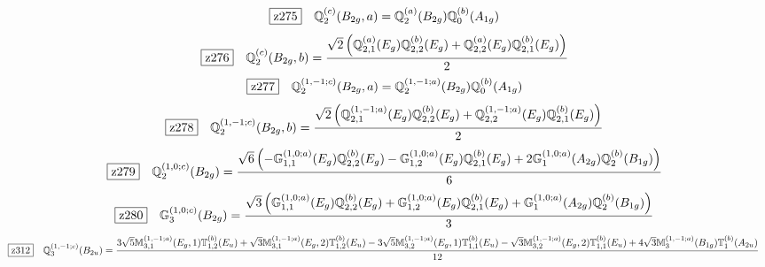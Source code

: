 \documentclass[fleqn,10pt,landscape]{jsarticle}
\begin{document}
\begin{dmath*}
\hspace*{3mm}\fbox{z275}\quad \mathbb{Q}_{2}^{(c)}(B_{2g},a)=\mathbb{Q}_{2}^{(a)}(B_{2g}) \mathbb{Q}_{0}^{(b)}(A_{1g})
\end{dmath*}
\begin{dmath*}
\hspace*{3mm}\fbox{z276}\quad \mathbb{Q}_{2}^{(c)}(B_{2g},b)=\frac{\sqrt{2} \left(\mathbb{Q}_{2,1}^{(a)}(E_{g}) \mathbb{Q}_{2,2}^{(b)}(E_{g}) + \mathbb{Q}_{2,2}^{(a)}(E_{g}) \mathbb{Q}_{2,1}^{(b)}(E_{g})\right)}{2}
\end{dmath*}
\begin{dmath*}
\hspace*{3mm}\fbox{z277}\quad \mathbb{Q}_{2}^{(1,-1;c)}(B_{2g},a)=\mathbb{Q}_{2}^{(1,-1;a)}(B_{2g}) \mathbb{Q}_{0}^{(b)}(A_{1g})
\end{dmath*}
\begin{dmath*}
\hspace*{3mm}\fbox{z278}\quad \mathbb{Q}_{2}^{(1,-1;c)}(B_{2g},b)=\frac{\sqrt{2} \left(\mathbb{Q}_{2,1}^{(1,-1;a)}(E_{g}) \mathbb{Q}_{2,2}^{(b)}(E_{g}) + \mathbb{Q}_{2,2}^{(1,-1;a)}(E_{g}) \mathbb{Q}_{2,1}^{(b)}(E_{g})\right)}{2}
\end{dmath*}
\begin{dmath*}
\hspace*{3mm}\fbox{z279}\quad \mathbb{Q}_{2}^{(1,0;c)}(B_{2g})=\frac{\sqrt{6} \left(- \mathbb{G}_{1,1}^{(1,0;a)}(E_{g}) \mathbb{Q}_{2,2}^{(b)}(E_{g}) - \mathbb{G}_{1,2}^{(1,0;a)}(E_{g}) \mathbb{Q}_{2,1}^{(b)}(E_{g}) + 2 \mathbb{G}_{1}^{(1,0;a)}(A_{2g}) \mathbb{Q}_{2}^{(b)}(B_{1g})\right)}{6}
\end{dmath*}
\begin{dmath*}
\hspace*{3mm}\fbox{z280}\quad \mathbb{G}_{3}^{(1,0;c)}(B_{2g})=\frac{\sqrt{3} \left(\mathbb{G}_{1,1}^{(1,0;a)}(E_{g}) \mathbb{Q}_{2,2}^{(b)}(E_{g}) + \mathbb{G}_{1,2}^{(1,0;a)}(E_{g}) \mathbb{Q}_{2,1}^{(b)}(E_{g}) + \mathbb{G}_{1}^{(1,0;a)}(A_{2g}) \mathbb{Q}_{2}^{(b)}(B_{1g})\right)}{3}
\end{dmath*}
\begin{dmath*}
\hspace*{3mm}\fbox{z312}\quad \mathbb{Q}_{3}^{(1,-1;c)}(B_{2u})=\frac{3 \sqrt{5} \mathbb{M}_{3,1}^{(1,-1;a)}(E_{g},1) \mathbb{T}_{1,2}^{(b)}(E_{u}) + \sqrt{3} \mathbb{M}_{3,1}^{(1,-1;a)}(E_{g},2) \mathbb{T}_{1,2}^{(b)}(E_{u}) - 3 \sqrt{5} \mathbb{M}_{3,2}^{(1,-1;a)}(E_{g},1) \mathbb{T}_{1,1}^{(b)}(E_{u}) - \sqrt{3} \mathbb{M}_{3,2}^{(1,-1;a)}(E_{g},2) \mathbb{T}_{1,1}^{(b)}(E_{u}) + 4 \sqrt{3} \mathbb{M}_{3}^{(1,-1;a)}(B_{1g}) \mathbb{T}_{1}^{(b)}(A_{2u})}{12}
\end{dmath*}
\end{document}
